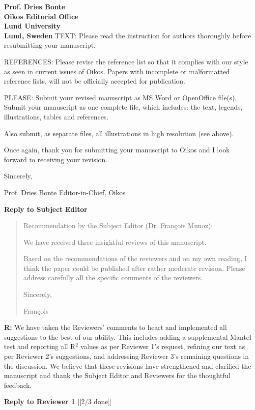 \documentclass[12pt]{letter}
\begin{document}
\begin{letter}{\bf Prof. Dries Bonte\\
Oikos Editorial Office \\
Lund University \\
Lund, Sweden}
TEXT: Please read the instruction for authors thoroughly before resubmitting your manuscript.

REFERENCES: Please revise the reference list so that it complies with our style as seen in current issues of Oikos. Papers with incomplete or malformatted reference lists, will not be officially accepted for publication.

PLEASE: Submit your revised manuscript as MS Word or OpenOffice file(s). Submit your manuscript as one complete file, which includes: the text, legends, illustrations, tables and references.

Also submit, as separate files, all illustrations in high resolution (see above).

Once again, thank you for submitting your manuscript to Oikos and I look forward to receiving your revision.

Sincerely,

Prof. Dries Bonte
Editor-in-Chief, Oikos


\clearpage

{\large \textbf{Reply to Subject Editor}}

  \begin{quotation}
    Recommendation by the Subject Editor (Dr. Fran\c{c}ois Munoz):

    We have received three insightful reviews of this manuscript.

    Based on the recommendations of the reviewers and on my own reading, I think the paper could be published after rather moderate revision. Please address carefully all the specific comments of the reviewers.

    Sincerely,

    Fran\c{c}ois
  \end{quotation}

  
  \textbf{R:} We have taken the Reviewers' comments to heart and implemented all suggestions to the best of our ability. This includes adding a supplemental Mantel test and reporting all R$^2$ values as per Reviewer 1's request, refining our text as per Reviewer 2's suggestions, and addressing Reviewer 3's remaining questions in the discussion. We believe that these revisions have strengthened and clarified the manuscript and thank the Subject Editor and Reviewers for the thoughtful feedback.


\clearpage

{\large\textbf{Reply to Reviewer 1}} [[2/3 done]]

  \begin{quotation}


\end{quotation}
\end{letter}
\end{document}
